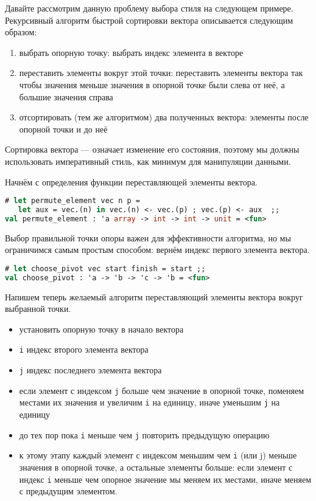 Давайте рассмотрим данную проблему выбора стиля на следующем примере.
Рекурсивный алгоритм быстрой сортировки вектора описывается следующим образом:

\begin{enumerate}
	\item выбрать опорную точку: выбрать индекс элемента в векторе

	\item переставить элементы вокруг этой точки: переставить элементы вектора
так чтобы значения меньше значения в опорной точке были слева от неё, а большие
значения справа

	\item отсортировать (тем же алгоритмом) два полученных вектора: элементы
после опорной точки и до неё
\end{enumerate}

Сортировка вектора --- означает изменение его состояния, поэтому мы должны
использовать императивный стиль, как минимум для манипуляции данными.

Начнём с определения функции переставляющей элементы вектора.

\begin{lstlisting}[language=OCaml]
# let permute_element vec n p =
   let aux = vec.(n) in vec.(n) <- vec.(p) ; vec.(p) <- aux  ;;
val permute_element : 'a array -> int -> int -> unit = <fun>
\end{lstlisting}

Выбор правильной точки опоры важен для эффективности алгоритма, но мы
ограничимся самым простым способом: вернём индекс первого элемента вектора.

\begin{lstlisting}[language=OCaml]
# let choose_pivot vec start finish = start ;;
val choose_pivot : 'a -> 'b -> 'c -> 'b = <fun>
\end{lstlisting}

Напишем теперь желаемый алгоритм переставляющий элементы вектора вокруг
выбранной точки.

\begin{itemize}
	\item установить опорную точку в начало вектора

	\item \texttt{i} индекс второго элемента вектора
	
	\item \texttt{j} индекс последнего элемента вектора
	
	\item если элемент с индексом \texttt{j} больше чем значение в опорной
точке, поменяем местами их значения и увеличим \texttt{i} на единицу, иначе
уменьшим \texttt{j} на единицу

	\item до тех пор пока \texttt{i} меньше чем \texttt{j} повторить предыдущую
операцию

	\item к этому этапу каждый элемент с индексом меньшим чем \texttt{i} (или
\texttt{}j) меньше значения в опорной точке, а остальные элементы больше: если
элемент с индекс \texttt{i} меньше чем опорное значение мы меняем их местами,
иначе меняем с предыдущим элементом.
\end{itemize}


